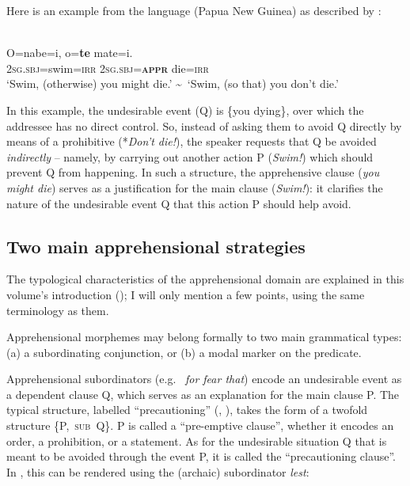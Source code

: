 \documentclass[output=paper,colorlinks,citecolor=brown]{langscibook}
\begin{document}
Here is an example from the  language  (Papua New Guinea) as described by \citet{smithdennis2021}:


 
\ea {} \\
\label{ex:Fra1}
\gll O=nabe=i, o=\textbf{te} mate=i. \\
\textsc{2sg.sbj}=swim=\textsc{irr} \textsc{2sg.sbj=\textbf{appr}} die=\textsc{irr} \\
\glt `Swim, (otherwise) you might die.' \textasciitilde~`Swim, (so that) you don't die.' 
\z
 
\noindent In this example, the undesirable event (Q) is \{you dying\}, over which the addressee has no direct control. So, instead of asking them to avoid Q directly by means of a prohibitive (*\textit{Don't die!}), the speaker requests that Q be avoided \textit{indirectly} -- namely, by carrying out another action P (\textit{Swim!}) which should prevent Q from happening. In such a structure, the apprehensive clause (\textit{you might die}) serves as a justification for the main clause (\textit{Swim!}): it clarifies the nature of the undesirable event Q that this action P should help avoid.
 

\subsection{Two main apprehensional strategies}
\label{subsec:twomain}

 
The typological characteristics of the apprehensional domain are explained in this volume's introduction (\citealt{chapters/introduction}); I will only mention a few points, using the same terminology as them. 

Apprehensional morphemes may belong formally to two main grammatical types: (a) a subordinating conjunction, or (b) a modal marker on the predicate.



Apprehensional subordinators (e.g.\  \textit{for fear that}) encode an undesirable event as a dependent clause Q, which serves as an explanation for the main clause P. The typical structure, labelled ``precautioning'' (\citealt[260]{vuillermet2018a}, \citealt{chapters/introduction}), takes the form of a twofold structure {\{P,~\textsc{sub}~Q\}}. P is called a ``pre-emptive clause'', whether it encodes an order, a prohibition, or a statement. As for the undesirable situation Q that is meant to be avoided through the event P, it is called the ``precautioning clause''. In , this can be rendered using the (archaic) subordinator \textit{lest}:
\end{document}

